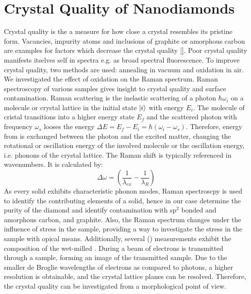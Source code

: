 
\chapter{Crystal Quality of Nanodiamonds}	\label{ch::crystal_quality}

Crystal quality is the a measure for how close a crystal resembles its pristine form\cite{}.
Vacancies, impurity atoms and inclusions of graphite or amorphous carbon are examples for factors which decrease the crystal quality \autoref{}.
Poor crystal quality manifests itselves self in \pl spectra e.g. as broad spectral \bkg fluorescence.
To improve crystal quality, two methods are used: annealing in vacuum and oxidation in air.
We investigated the effect of oxidation on the Raman spectrum.
Raman spectroscopy of various samples gives insight to crystal quality and surface contamination.
Raman scattering is the inelastic scattering of a photon $\hbar\omega_i$ on a molecule or crystal lattice in the initial state $\ket{i}$ with energy $E_i$.
The molecule of cristal transitions into a higher energy state $E_f$ and the scattered photon with frequency $\omega_s$ looses the energy $\Delta E = E_f - E_i = \hbar(\omega_i-\omega_s)$.
Therefore, energy from is exchanged between the photon and the excited matter, changing the rotational or oscillation energy of the involved molecule or the oscillation energy, i.e. phonons of the crystal lattice.
The Raman shift is typically referenced in wavenumbers.
It is calculated by:
\begin{equation}
	\Delta \omega = \left( \frac{1}{\lambda_{ex}}-\frac{1}{\lambda_R}\right)
\end{equation}
As every solid exhibits characteristic phonon modes, Raman spectroscpy is used to identify the contributing elements of  a solid, hence in our case determine the purity of the diamond and identify contamination with sp$^2$ bonded and amorphous carbon, and graphite.
Also, the Raman spectrum changes under the influence of stress in the sample, providing a way to investigate the stress in the sample with opical means.
Additionally, several \tem (\TEM) measurements exhibit the composition of the wet-milled \nds. 
During \tem a beam of electrons is transmitted through a sample, forming an image of the transmitted sample.
Due to the smaller de Broglie wavelengths of electrons as compared to photons, a higher resolution is obtainable, and the crystal lattice planes can be resolved.
Therefore, the crystal quality can be investigated from a morphological point of view.


